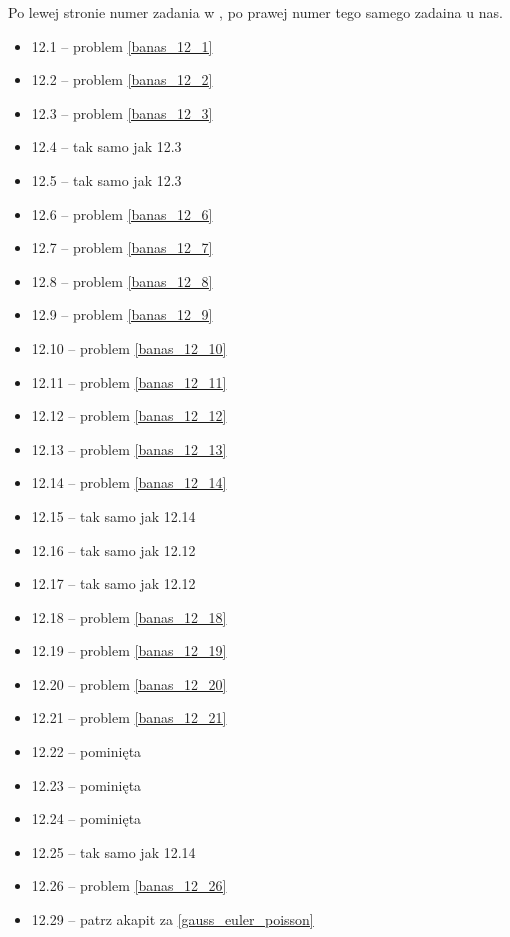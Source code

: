 Po lewej stronie numer zadania w \cite{wedrychowicz12}, po prawej numer tego samego zadaina u nas.

\begin{multicols}{3}
\begin{itemize}
    \item 12.1 -- problem \ref{banas_12_1}
    \item 12.2 -- problem \ref{banas_12_2}
    \item 12.3 -- problem \ref{banas_12_3}
    \item 12.4 -- tak samo jak 12.3
    \item 12.5 -- tak samo jak 12.3
    \item 12.6 -- problem \ref{banas_12_6}
    \item 12.7 -- problem \ref{banas_12_7}
    \item 12.8 -- problem \ref{banas_12_8}
    \item 12.9 -- problem \ref{banas_12_9}
    \item 12.10 -- problem \ref{banas_12_10}
    \item 12.11 -- problem \ref{banas_12_11}
    \item 12.12 -- problem \ref{banas_12_12}
    \item 12.13 -- problem \ref{banas_12_13}
    \item 12.14 -- problem \ref{banas_12_14}
    \item 12.15 -- tak samo jak 12.14
    \item 12.16 -- tak samo jak 12.12
    \item 12.17 -- tak samo jak 12.12
    \item 12.18 -- problem \ref{banas_12_18}
    \item 12.19 -- problem \ref{banas_12_19}
    \item 12.20 -- problem \ref{banas_12_20}
    \item 12.21 -- problem \ref{banas_12_21}
    \item 12.22 -- pominięta
    \item 12.23 -- pominięta
    \item 12.24 -- pominięta
    \item 12.25 -- tak samo jak  12.14
    \item 12.26 -- problem \ref{banas_12_26}
    \item 12.29 -- patrz akapit za \ref{gauss_euler_poisson}

\end{itemize}
\end{multicols}
